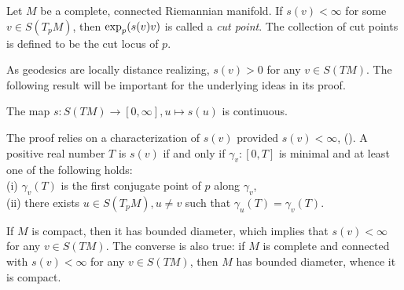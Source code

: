 \begin{defn}\label{cutlocus2}
    Let $M$ be a complete, connected Riemannian manifold. If $s(v)<\infty$ for some $v\in S(T_pM)$, then $\textup{exp}_p(s(v)v)$ is called a \textit{cut point}. The collection of cut points is defined to be the cut locus of $p$.
\end{defn}

\vspace{0.3cm}
\hf As geodesics are locally distance realizing, $s(v)> 0$ for any $v\in S(TM)$. The following result \cite[Proposition 4.1]{Sak96} will be important for the underlying ideas in its proof.
\begin{prop}\label{scts}
    The  map $s:S(TM)\to [0,\infty], u\mapsto s(u)$ is continuous.
\end{prop}
\vspace{0.3cm}
\noindent The proof relies on a characterization of $s(v)$ provided $s(v)<\infty$, (). A positive real number $T$ is $s(v)$ if and only if $\gamma_v:[0,T]$ is minimal and at least one of the following holds:\\
\hf (i) $\gamma_v(T)$ is the first conjugate point of $p$ along $\gamma_v$,\\
\hf (ii) there exists $u\in S(T_pM), u\neq v$ such that $\gamma_u(T)=\gamma_v(T)$.

\begin{rem}
    If $M$ is compact, then it has bounded diameter, which implies that $s(v)<\infty$ for any $v\in S(TM)$. The converse is also true: if $M$ is complete and connected with $s(v)<\infty$ for any $v\in S(TM)$, then $M$ has bounded diameter, whence it is compact. 
\end{rem}


